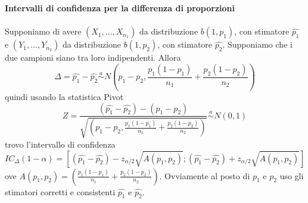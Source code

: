 \\ \\
\noindent\textbf{Intervalli di confidenza per la differenza di proporzioni}
\\ \\

Supponiamo di avere $(X_1,...,X_{n_1})$ da distribuzione $b(1,p_1)$, con stimatore $\hat{p_1}$ e $(Y_1,...,Y_{n_2})$ da distribuzione $b(1,p_2)$, con stimatore $\hat{p_2}$. Supponiamo che i due campioni siano tra loro indipendenti. Allora $$\Delta=\hat{p_1} - \hat{p_2} \stackrel {a} {\sim} N\left( p_1 - p_2, \frac{p_1(1-p_1)}{n_1} + \frac{p_2(1-p_2)}{n_2}\right)$$ quindi usando la statistica Pivot 
$$Z=\frac{(\hat{p_1} - \hat{p_2}) - (p_1 - p_2)}{\sqrt{\left( p_1 - p_2, \frac{p_1(1-p_1)}{n_1} + \frac{p_2(1-p_2)}{n_2}\right)}} \stackrel {a} {\sim} N(0,1)$$ trovo l'intervallo di confidenza $$IC_\Delta (1-\alpha) = \left[ 
(\hat{p_1} - \hat{p_2}) - z_{\alpha / 2} \sqrt{A(p_1,p_2)};(\hat{p_1} - \hat{p_2}) + z_{\alpha / 2} \sqrt{A(p_1,p_2)}
 \right]$$ ove $A(p_1,p_2)=\left(\frac{p_1(1-p_1)}{n_1} + \frac{p_2(1-p_2)}{n_2}\right)$. Ovviamente al posto di $p_1$ e $p_2$ uso gli stimatori corretti e consistenti $\hat{p_1}$ e $\hat{p_2}$.